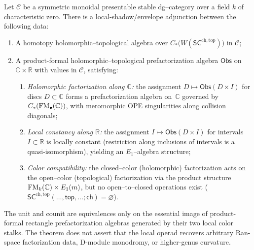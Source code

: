 \begin{theorem}
\label{thm:recognition-foundations}
\label{thm:recognition}
Let $\mathcal C$ be a symmetric monoidal presentable stable
dg--category over a field $k$ of characteristic zero.
There is a local-shadow/envelope adjunction between the following
data:
\begin{enumerate}[label=(\roman*)]
\item A homotopy holomorphic--topological algebra over
 $C_\ast\!\bigl(W(\mathsf{SC}^{\mathrm{ch,top}})\bigr)$ in
 $\mathcal C$;
\item A product-formal holomorphic--topological prefactorization algebra
 $\mathsf{Obs}$ on~$\mathbb C\times\mathbb R$ with values in
 $\mathcal C$, satisfying:
 \begin{enumerate}[label=(\alph*)]
 \item \emph{Holomorphic factorization along $\mathbb C$:} the
 assignment $D\mapsto\mathsf{Obs}(D\times I)$ for discs
 $D\subset\mathbb C$ forms a prefactorization algebra
 on~$\mathbb C$ governed by
 $C_\ast(\mathrm{FM}_\bullet(\mathbb C))$, with meromorphic OPE
 singularities along collision diagonals;
 \item \emph{Local constancy along $\mathbb R$:} the assignment
 $I\mapsto\mathsf{Obs}(D\times I)$ for intervals
 $I\subset\mathbb R$ is locally constant (restriction along
 inclusions of intervals is a quasi-isomorphism), yielding an
 $E_1$--algebra structure;
 \item \emph{Color compatibility:} the closed--color
 (holomorphic) factorization acts on the open--color
 (topological) factorization via the product structure
 $\mathrm{FM}_k(\mathbb C)\times E_1(m)$, but no open--to--closed
 operations exist ($\mathsf{SC}^{\mathrm{ch,top}}(\ldots,
 \mathsf{top},\ldots;\mathsf{ch})=\varnothing$).
 \end{enumerate}
\end{enumerate}
\noindent
The unit and counit are equivalences only on the essential image of
product-formal rectangle prefactorization algebras generated by their
two local color stalks. The theorem does not assert that the local
operad recovers arbitrary Ran-space factorization data, D-module
monodromy, or higher-genus curvature.
\end{theorem}

